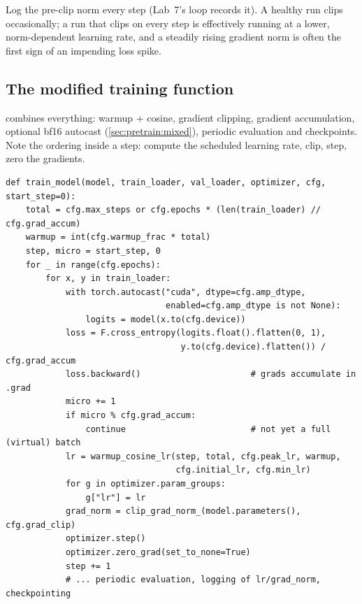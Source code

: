 \begin{pitfall}
Log the pre-clip norm every step (Lab~7's loop records it). A healthy run clips occasionally;
a run that clips on every step is effectively running at a lower, norm-dependent learning rate,
and a steadily rising gradient norm is often the first sign of an impending loss spike.
\end{pitfall}

\subsection{The modified training function}\label{sec:pretrain:trainfn}

 combines everything: warmup + cosine, gradient clipping,
gradient accumulation, optional bf16 autocast (\cref{sec:pretrain:mixed}), periodic evaluation
and checkpoints. Note the ordering inside a step: compute the scheduled learning rate, clip,
step, zero the gradients.

\begin{lstlisting}[caption={The full training function from Lab 7 (abridged).},label={lst:pretrain:trainmodel}]
def train_model(model, train_loader, val_loader, optimizer, cfg, start_step=0):
    total = cfg.max_steps or cfg.epochs * (len(train_loader) // cfg.grad_accum)
    warmup = int(cfg.warmup_frac * total)
    step, micro = start_step, 0
    for _ in range(cfg.epochs):
        for x, y in train_loader:
            with torch.autocast("cuda", dtype=cfg.amp_dtype,
                                enabled=cfg.amp_dtype is not None):
                logits = model(x.to(cfg.device))
            loss = F.cross_entropy(logits.float().flatten(0, 1),
                                   y.to(cfg.device).flatten()) / cfg.grad_accum
            loss.backward()                      # grads accumulate in .grad
            micro += 1
            if micro % cfg.grad_accum:
                continue                         # not yet a full (virtual) batch
            lr = warmup_cosine_lr(step, total, cfg.peak_lr, warmup,
                                  cfg.initial_lr, cfg.min_lr)
            for g in optimizer.param_groups:
                g["lr"] = lr
            grad_norm = clip_grad_norm_(model.parameters(), cfg.grad_clip)
            optimizer.step()
            optimizer.zero_grad(set_to_none=True)
            step += 1
            # ... periodic evaluation, logging of lr/grad_norm, checkpointing
\end{lstlisting}


